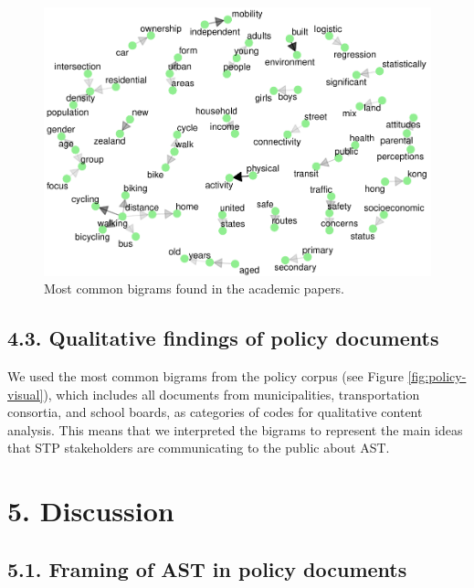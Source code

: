 \documentclass[]{elsarticle} %
\begin{document}
\begin{figure}

{\centering \includegraphics[width=1\linewidth]{AST-Framing-Ontario_files/figure-latex/academic-visual-1} 

}

\caption{Most common bigrams found in the academic papers.}\label{fig:academic-visual}
\end{figure}

\hypertarget{qualitative-findings-of-policy-documents}{%
\subsection{4.3. Qualitative findings of policy
documents}\label{qualitative-findings-of-policy-documents}}

We used the most common bigrams from the policy corpus (see Figure
\ref{fig:policy-visual}), which includes all documents from
municipalities, transportation consortia, and school boards, as
categories of codes for qualitative content analysis. This means that we
interpreted the bigrams to represent the main ideas that STP
stakeholders are communicating to the public about AST.

\hypertarget{discussion}{%
\section{5. Discussion}\label{discussion}}

\hypertarget{framing-of-ast-in-policy-documents}{%
\subsection{5.1. Framing of AST in policy
documents}\label{framing-of-ast-in-policy-documents}}
\end{document}

